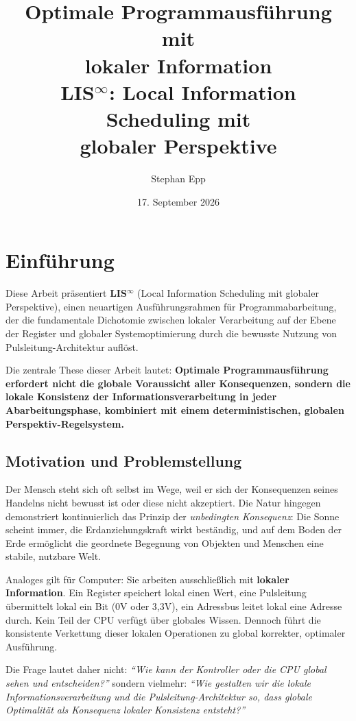\documentclass[a4paper,12pt]{article}
\title{\texorpdfstring{\textbf{Optimale Programmausführung mit\\ lokaler Information}\\
	LIS$^{\infty}$: Local Information Scheduling mit\\ globaler Perspektive}{Optimale Programmausführung mit lokaler Information\\LIS-infty: Local Information Scheduling mit globaler Perspektive}}
\author{Stephan Epp}
\date{17. September 2026}
\theoremstyle{definition}
\begin{document}
	
\maketitle

\tableofcontents
\newpage

\section{Einführung}

Diese Arbeit präsentiert \textbf{LIS$^{\infty}$} (Local Information Scheduling mit globaler Perspektive), einen neuartigen Ausführungsrahmen für Programmabarbeitung, der die fundamentale Dichotomie zwischen lokaler Verarbeitung auf der Ebene der Register und globaler Systemoptimierung durch die bewusste Nutzung von Pulsleitung-Architektur auflöst. 

Die zentrale These dieser Arbeit lautet: \textbf{Optimale Programmausführung erfordert nicht die globale Voraussicht aller Konsequenzen, sondern die lokale Konsistenz der Informationsverarbeitung in jeder Abarbeitungsphase, kombiniert mit einem deterministischen, globalen Perspektiv-Regelsystem.}

\subsection{Motivation und Problemstellung}

Der Mensch steht sich oft selbst im Wege, weil er sich der Konsequenzen seines Handelns nicht bewusst ist oder diese nicht akzeptiert. Die Natur hingegen demonstriert kontinuierlich das Prinzip der \emph{unbedingten Konsequenz}: Die Sonne scheint immer, die Erdanziehungskraft wirkt beständig, und auf dem Boden der Erde ermöglicht die geordnete Begegnung von Objekten und Menschen eine stabile, nutzbare Welt.

Analoges gilt für Computer: Sie arbeiten ausschließlich mit \textbf{lokaler Information}. Ein Register speichert lokal einen Wert, eine Pulsleitung übermittelt lokal ein Bit (0V oder 3,3V), ein Adressbus leitet lokal eine Adresse durch. Kein Teil der CPU verfügt über globales Wissen. Dennoch führt die konsistente Verkettung dieser lokalen Operationen zu global korrekter, optimaler Ausführung.

Die Frage lautet daher nicht: \textit{``Wie kann der Kontroller oder die CPU global sehen und entscheiden?''} sondern vielmehr: \textit{``Wie gestalten wir die lokale Informationsverarbeitung und die Pulsleitung-Architektur so, dass globale Optimalität als Konsequenz lokaler Konsistenz entsteht?''}
\end{document}
